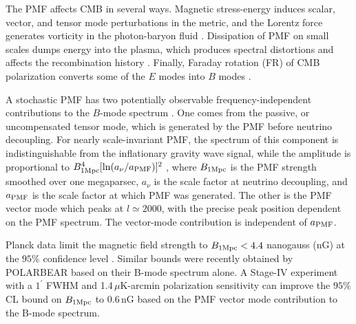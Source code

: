 The PMF affects CMB in several ways. Magnetic stress-energy induces scalar, vector, and tensor mode perturbations in the metric, and the Lorentz force generates vorticity in the photon-baryon fluid \cite{Subramanian:1998fn,Mack:2001gc,Lewis:2004ef,Shaw:2009nf,Paoletti:2010rx}. Dissipation of PMF on small scales dumps energy into the plasma, which produces spectral distortions and affects the recombination history \cite{Kunze:2014eka}.  Finally, Faraday rotation (FR) of CMB polarization converts some of the $E$ modes into $B$ modes \cite{Kosowsky:2004zh,Pogosian:2011qv}.

A stochastic PMF has two potentially observable frequency-independent contributions to the $B$-mode spectrum \cite{Shaw:2009nf}. One comes from the passive, or uncompensated tensor mode, which is generated by the PMF before neutrino decoupling. For nearly scale-invariant PMF, the spectrum of this component is indistinguishable from the inflationary gravity wave signal, while the amplitude is proportional to $B^4_{1\rm{Mpc}} [\ln(a_\nu / a_{\rm{PMF}})]^2$ \cite{Lewis:2004ef}, where $B_{1\rm{Mpc}}$ is the PMF strength smoothed over one megaparsec, $a_\nu$ is the scale factor at neutrino decoupling, and $a_{\rm{PMF}}$ is the scale factor at which PMF was generated. The other is the PMF vector mode which peaks at $l \simeq 2000$, with the precise peak position dependent on the PMF spectrum. The vector-mode contribution is independent of $a_{\rm{PMF}}$.

Planck data limit the magnetic field strength to $B_{1 {\rm Mpc}}<4.4$ nanogauss (nG) at the $95\%$ confidence level \cite{Ade:2015cva}. Similar bounds were recently obtained by POLARBEAR \cite{Ade:2015cao} based on their B-mode spectrum alone. A Stage-IV experiment with a $1^\prime$ FWHM and 1.4\,$\mu$K-arcmin polarization sensitivity can improve the $95\%$ CL bound on $B_{1 {\rm Mpc}}$ to 0.6\,nG based on the PMF vector mode contribution to the B-mode spectrum.

